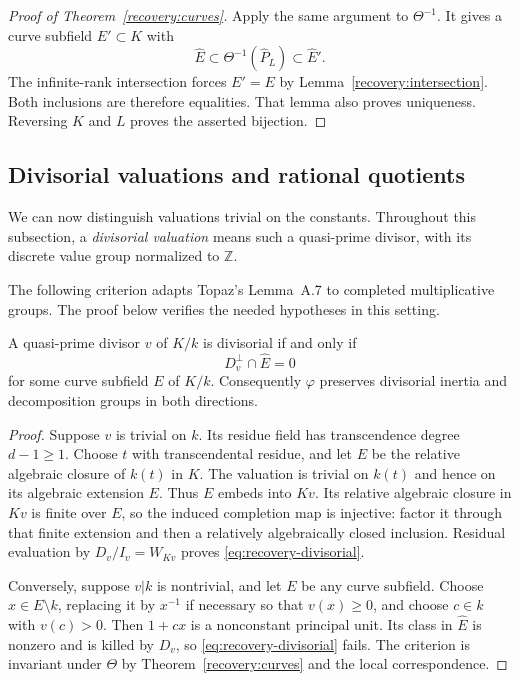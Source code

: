 \begin{proof}[Proof of Theorem~\ref{recovery:curves}]
Apply the same argument to $\Theta^{-1}$. It gives a curve subfield
$E'\subset K$ with
\[
 \widehat E\subset\Theta^{-1}(\widehat P_L)
 \subset\widehat E'.
\]
The infinite-rank intersection forces $E'=E$ by
Lemma~\ref{recovery:intersection}. Both inclusions are therefore
equalities. That lemma also proves uniqueness. Reversing $K$ and $L$
proves the asserted bijection.
\end{proof}

\subsection{Divisorial valuations and rational quotients}

We can now distinguish valuations trivial on the constants. Throughout
this subsection, a \emph{divisorial valuation} means such a
quasi-prime divisor, with its discrete value group normalized to
$\mathbb Z$.

The following criterion adapts Topaz's Lemma~A.7
\cite[Lemma~A.7]{TopazTorelli2025} to completed multiplicative groups.
The proof below verifies the needed hypotheses in this setting.

\begin{proposition}\label{recovery:divisorial}
A quasi-prime divisor $v$ of $K/k$ is divisorial if and only if
\begin{equation}\label{eq:recovery-divisorial}
 D_v^\perp\cap\widehat E=0
\end{equation}
for some curve subfield $E$ of $K/k$. Consequently $\varphi$
preserves divisorial inertia and decomposition groups in both
directions.
\end{proposition}

\begin{proof}
Suppose $v$ is trivial on $k$. Its residue field has transcendence
degree $d-1\geq1$. Choose $t$ with transcendental residue, and let
$E$ be the relative algebraic closure of $k(t)$ in $K$. The valuation
is trivial on $k(t)$ and hence on its algebraic extension $E$.
Thus $E$ embeds into $Kv$. Its relative algebraic closure in $Kv$
is finite over $E$, so the induced completion map is injective:
factor it through that finite extension and then a relatively
algebraically closed inclusion. Residual evaluation by
$D_v/I_v=W_{Kv}$ proves \eqref{eq:recovery-divisorial}.

Conversely, suppose $v|k$ is nontrivial, and let $E$ be any curve
subfield. Choose $x\in E\setminus k$, replacing it by $x^{-1}$ if
necessary so that $v(x)\geq0$, and choose $c\in k$ with $v(c)>0$.
Then $1+cx$ is a nonconstant principal unit. Its class in
$\widehat E$ is nonzero and is killed by $D_v$, so
\eqref{eq:recovery-divisorial} fails. The criterion is invariant
under $\Theta$ by Theorem~\ref{recovery:curves} and the local
correspondence.
\end{proof}

